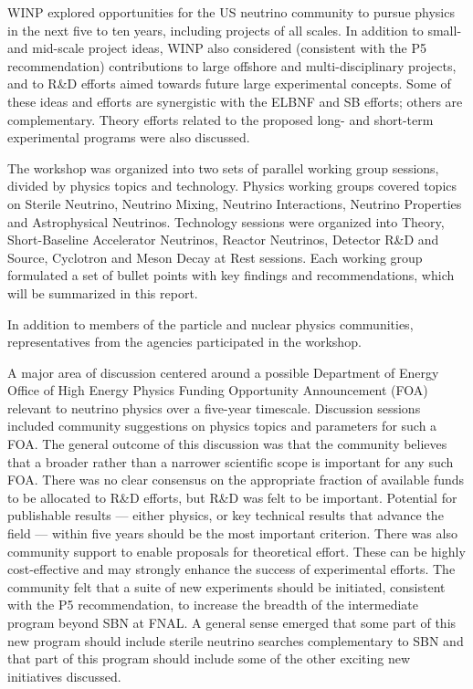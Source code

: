 WINP explored opportunities for the US neutrino community to pursue
physics in the next five to ten years, including projects of all
scales.  In addition to small- and mid-scale project ideas, WINP also
considered (consistent with the P5 recommendation) contributions to
large offshore and multi-disciplinary projects, and to R\&D efforts
aimed towards future large experimental concepts.  Some of these ideas
and efforts are synergistic with the ELBNF and SB efforts; others are
complementary.  Theory efforts related to the proposed long- and
short-term experimental programs were also discussed.

The workshop was organized into two sets of parallel working group
sessions, divided by physics topics and technology.  Physics working
groups covered topics on Sterile Neutrino, Neutrino Mixing, Neutrino
Interactions, Neutrino Properties and Astrophysical Neutrinos.
Technology sessions were organized into Theory, Short-Baseline
Accelerator Neutrinos, Reactor Neutrinos, Detector R\&D and Source,
Cyclotron and Meson Decay at Rest sessions.  Each working group
formulated a set of bullet points with key findings and
recommendations, which will be summarized in this report.


In addition to members of the particle and nuclear physics
communities, representatives from the agencies participated in the workshop.

A major area of discussion centered around a possible Department of Energy
Office of High Energy Physics Funding Opportunity
Announcement (FOA) relevant to neutrino physics over a five-year timescale.
Discussion sessions included community suggestions on physics topics and parameters for such a FOA.
The general outcome of this discussion was that the community believes that a
broader rather than a narrower scientific scope is important for any such FOA.  There was no clear
consensus on the appropriate fraction of available funds to be
allocated to R\&D efforts, but R\&D was felt to be important.  
Potential for publishable results ---
either physics, or key technical results that advance the field ---
within five years should be the most important criterion.  There was
also community support to enable proposals for theoretical effort.
These can be highly cost-effective and may strongly enhance the
success of experimental efforts.  
The community felt that a suite of new experiments should be
initiated, consistent with the P5 recommendation, to increase the
breadth of the intermediate program beyond SBN at FNAL. A general
sense emerged that some part of this new program should include
sterile neutrino searches complementary to SBN and that part of this
program should include some of the other exciting new initiatives
discussed.

